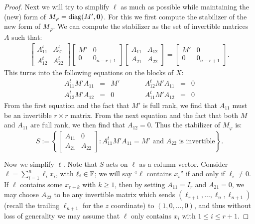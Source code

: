 \documentclass[11pt]{article}
\begin{document}
\begin{proof}
Next we will try to simplify $\ell$ as much as possible while maintaining the (new) form of $M_\varphi = \operatorname{diag}(M',\mathbf{0})$. For this we first compute the stabilizer of the new form of $M_{\varphi}$. We can compute the stabilizer as the set of invertible matrices $A$ such that:
\begin{eqnarray*}
\begin{bmatrix}
A_{11}^t & A_{21}^t \\
A_{12}^t & A_{22}^t
\end{bmatrix}
\begin{bmatrix}
M' & 0 \\
0 & 0_{n-r+1}
\end{bmatrix}
\begin{bmatrix}
A_{11} & A_{12} \\
A_{21} & A_{22} 
\end{bmatrix}
=
\begin{bmatrix}
M' & 0 \\
0 & 0_{n-r+1}
\end{bmatrix}. 
\end{eqnarray*}
This turns into the following equations on the blocks of $X$:
\[
\begin{array}{rclcrcl}
A_{11}^t M' A_{11} & = & M' & \qquad & 
A_{12}^t M' A_{11} & = & 0 \\
A_{12}^t M' A_{12} & = & 0 & \qquad & 
A_{11}^t M' A_{12} & = & 0
\end{array}
\]
From the first equation and the fact that $M'$ is full rank, we find that $A_{11}$ must be an invertible $r \times r$ matrix. From the next equation and the fact that both $M$ and $A_{11}$ are full rank, we then find that $A_{12} = 0$. Thus the stabilizer of $M_{\varphi}$ is:
\[
S := \left\{ \begin{bmatrix} A_{11} & 0 \\ A_{21} & A_{22} \end{bmatrix} : A_{11}^t M' A_{11} = M' \text{ and } A_{22} \text{ is invertible} \right\}.
\]

Now we simplify $\ell$. Note that $S$ acts on $\ell$ as a column vector. Consider $\ell = \sum_{i=1}^n \ell_i x_i$, with $\ell_i \in \mathbb{F}$; we will say ``$\ell$ contains $x_i$'' if and only if $\ell_i \neq 0$. If $\ell$ contains some $x_{r+k}$ with $k \geq 1$, then by setting $A_{11} = I_r$ and $A_{21} = 0$, we may choose $A_{22}$ to be any invertible matrix which sends $(\ell_{r+1}, \dotsc, \ell_n, \ell_{n+1})$ (recall the trailing $\ell_{n+1}$ for the $z$ coordinate) to $(1,0,\dotsc,0)$, and thus without loss of generality we may assume that $\ell$ only contains $x_i$ with $1 \leq i \leq r+1$. 


\end{proof}
\end{document}
